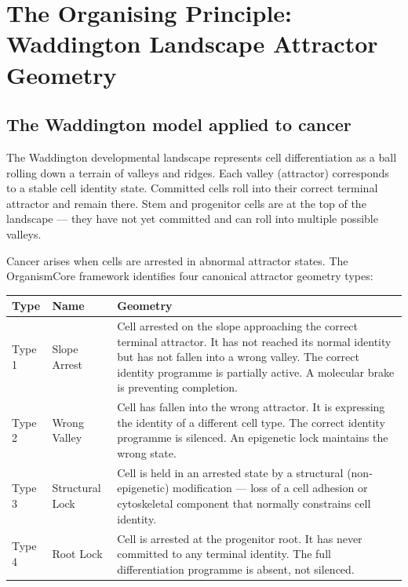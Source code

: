 \documentclass[12pt, a4paper]{article}
\begin{document}
\section{The Organising Principle: Waddington Landscape
Attractor Geometry}

\subsection{The Waddington model applied to cancer}

The Waddington developmental landscape represents cell
differentiation as a ball rolling down a terrain of
valleys and ridges. Each valley (attractor) corresponds
to a stable cell identity state. Committed cells roll
into their correct terminal attractor and remain there.
Stem and progenitor cells are at the top of the
landscape --- they have not yet committed and can roll
into multiple possible valleys.

Cancer arises when cells are arrested in abnormal
attractor states. The OrganismCore framework identifies
four canonical attractor geometry types:

\begin{center}
\begin{tabular}{p{1.5cm}p{3cm}p{9cm}}
\toprule
\textbf{Type} & \textbf{Name} & \textbf{Geometry} \\
\midrule
Type 1
& Slope Arrest
& Cell arrested on the slope approaching the correct
  terminal attractor. It has not reached its normal
  identity but has not fallen into a wrong valley.
  The correct identity programme is partially active.
  A molecular brake is preventing completion. \\[0.3em]
Type 2
& Wrong Valley
& Cell has fallen into the wrong attractor. It is
  expressing the identity of a different cell type.
  The correct identity programme is silenced.
  An epigenetic lock maintains the wrong state. \\[0.3em]
Type 3
& Structural Lock
& Cell is held in an arrested state by a structural
  (non-epigenetic) modification --- loss of a cell
  adhesion or cytoskeletal component that normally
  constrains cell identity. \\[0.3em]
Type 4
& Root Lock
& Cell is arrested at the progenitor root. It has
  never committed to any terminal identity.
  The full differentiation programme is absent,
  not silenced. \\
\bottomrule
\end{tabular}
\end{center}
\end{document}
